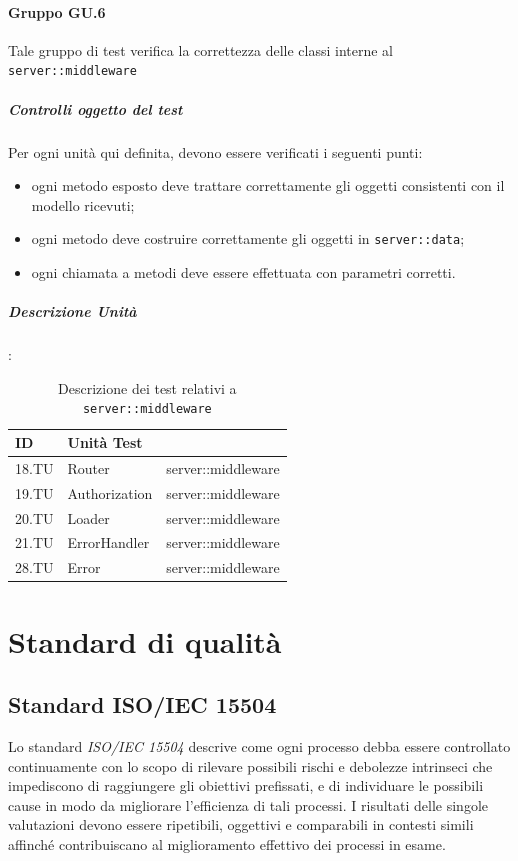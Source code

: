\documentclass[12pt,a4paper]{article}
\begin{document}
\paragraph{Gruppo GU.6}
Tale gruppo di test verifica la correttezza delle classi interne al  \texttt{server::middleware}
\subparagraph{Controlli oggetto del test}
Per ogni unità  qui definita, devono essere verificati i seguenti punti:
\begin{itemize}
	\item ogni metodo esposto deve trattare correttamente gli oggetti consistenti con il modello ricevuti;
	\item ogni metodo deve costruire correttamente gli oggetti in \texttt{server::data};
	\item ogni chiamata a metodi deve essere effettuata con parametri corretti.
\end{itemize}
\subparagraph{Descrizione Unità}:
\begin{table}[H]
	\begin{center}
		\begin{tabular}{p{} p{} p{}}
			\toprule
			\textbf{ID}   & \textbf{Unità Test}	& \textbf{\mgls{package}} \\ \midrule
			\midrule
			18.TU & Router & server::middleware\\ \midrule
			19.TU & Authorization & server::middleware\\ \midrule
			20.TU & Loader & server::middleware\\ \midrule
			21.TU & ErrorHandler & server::middleware\\ \midrule
			28.TU & Error & server::middleware\\ \midrule			
			\bottomrule
		\end{tabular}
	\end{center}
	\caption{Descrizione dei test relativi a \texttt{server::middleware}}
\end{table}
\newpage
\section{Standard di qualità}\label{standard}
\subsection{Standard ISO/IEC 15504}
Lo standard \textit{ISO/IEC 15504} descrive come ogni processo debba essere controllato continuamente con lo scopo di rilevare possibili rischi e debolezze intrinseci che impediscono di raggiungere gli obiettivi prefissati, e di individuare le possibili cause in modo da migliorare l'efficienza di tali processi. I risultati delle singole valutazioni devono essere ripetibili, oggettivi e comparabili in contesti simili affinché contribuiscano al miglioramento effettivo dei processi in esame.
\end{document}
